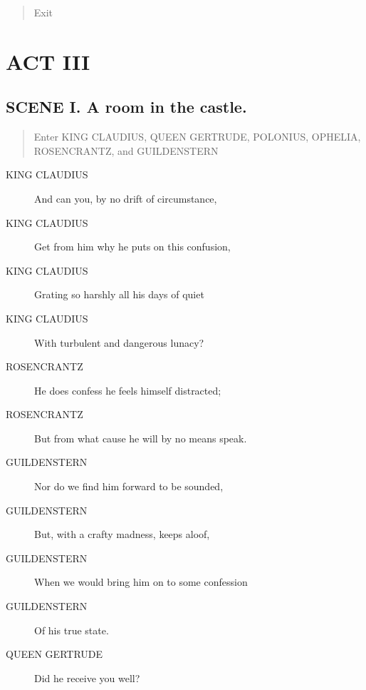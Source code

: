 \documentclass{article}
\begin{document}
\begin{quote}
Exit
\end{quote}
          
\section{ACT III}
    
\subsection{SCENE I.  A room in the castle.}
          
\begin{quote}
Enter KING CLAUDIUS, QUEEN GERTRUDE, POLONIUS,
OPHELIA, ROSENCRANTZ, and GUILDENSTERN
\end{quote}
          
\begin{description}
            
\item[KING CLAUDIUS] And can you, by no drift of circumstance,
\item[KING CLAUDIUS] Get from him why he puts on this confusion,
\item[KING CLAUDIUS] Grating so harshly all his days of quiet
\item[KING CLAUDIUS] With turbulent and dangerous lunacy?
\end{description}
          
\begin{description}
            
\item[ROSENCRANTZ] He does confess he feels himself distracted;
\item[ROSENCRANTZ] But from what cause he will by no means speak.
\end{description}
          
\begin{description}
            
\item[GUILDENSTERN] Nor do we find him forward to be sounded,
\item[GUILDENSTERN] But, with a crafty madness, keeps aloof,
\item[GUILDENSTERN] When we would bring him on to some confession
\item[GUILDENSTERN] Of his true state.
\end{description}
          
\begin{description}
            
\item[QUEEN GERTRUDE] Did he receive you well?
\end{description}
          
\end{document}
